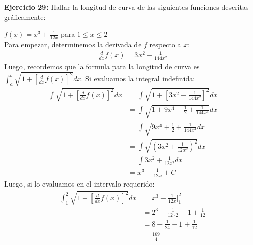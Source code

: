 \documentclass[../main.tex]{subfiles}
\begin{document}
    \question \textbf{Ejercicio 29:} Hallar la longitud de curva de las siguientes funciones descritas gráficamente:
    \begin{partes}
        \parte $f(x) = x^3 + \frac{1}{12x}$ para $1 \le x \le 2$\\

        Para empezar, determinemos la derivada de $f$ respecto a $x$:
        \begin{align*}
            \frac{d}{dx} f(x) = 3x^2 - \frac{1}{144x^2}
        \end{align*}
        Luego, recordemos que la formula para la longitud de curva es $\int_{a}^b \sqrt{1+\left[\frac{d}{dx} f(x)\right]^2} dx$. Si evaluamos la integral indefinida:
        \begin{align*}
            \int \sqrt{1+\left[\frac{d}{dx} f(x)\right]^2}dx &= \int \sqrt{1+\left[3x^2 - \frac{1}{144x^2}\right]^2}dx\\
            &= \int \sqrt{1+9x^4 - \frac{1}{2} + \frac{1}{144x^4}}dx\\
            &= \int \sqrt{9x^4 + \frac{1}{2} + \frac{1}{144x^4}}dx\\
            &= \int \sqrt{\left(3x^2 + \frac{1}{12x^2}\right)^2}dx\\
            &= \int 3x^2 + \frac{1}{12x^2}dx\\
            &= x^3 - \frac{1}{12x} + C
        \end{align*}
        Luego, si lo evaluamos en el intervalo requerido:
        \begin{align*}
            \int_{1}^2 \sqrt{1+\left[\frac{d}{dx} f(x)\right]^2} dx &= x^3 - \frac{1}{12x} |_1^2\\
            &= 2^3 - \frac{1}{12\cdot 2} - 1 + \frac{1}{12}\\
            &= 8 - \frac{1}{24} - 1 + \frac{1}{12}\\
            &= \frac{169}{4}
        \end{align*}
    \end{partes}
\end{document}

